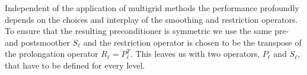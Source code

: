 \documentclass[a4paper,10pt,3p,preprint,pdftex]{elsarticle}
\begin{document}



Independent of the application of multigrid methods the performance
profoundly depends on the choices and interplay of the smoothing and
restriction operators. To ensure that the resulting preconditioner is
symmetric we use the same pre- and postsmoother $S_\ell$ and the
restriction operator is chosen to be the transpose of the prolongation
operator $R_\ell = P_\ell^T$. This leaves us with two operators,
$P_\ell$ and $S_\ell$, that have to be defined for every level.

\end{document}
